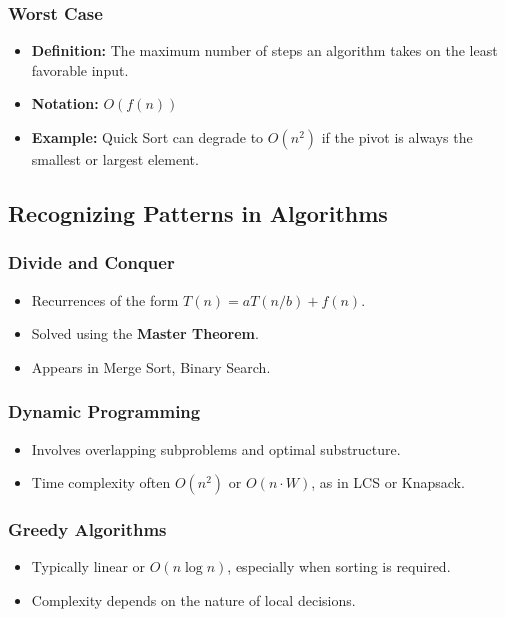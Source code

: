 \documentclass[12pt]{article}
\begin{document}
\subsubsection{Worst Case}
\begin{itemize}
    \item \textbf{Definition:} The maximum number of steps an algorithm takes on the least favorable input.
    \item \textbf{Notation:} \( O(f(n)) \)
    \item \textbf{Example:} Quick Sort can degrade to \( O(n^2) \) if the pivot is always the smallest or largest element.
\end{itemize}

\subsection{Recognizing Patterns in Algorithms}

\subsubsection{Divide and Conquer}
\begin{itemize}
    \item Recurrences of the form \( T(n) = aT(n/b) + f(n) \).
    \item Solved using the \textbf{Master Theorem}.
    \item Appears in Merge Sort, Binary Search.
\end{itemize}

\subsubsection{Dynamic Programming}
\begin{itemize}
    \item Involves overlapping subproblems and optimal substructure.
    \item Time complexity often \( O(n^2) \) or \( O(n \cdot W) \), as in LCS or Knapsack.
\end{itemize}

\subsubsection{Greedy Algorithms}
\begin{itemize}
    \item Typically linear or \( O(n \log n) \), especially when sorting is required.
    \item Complexity depends on the nature of local decisions.
\end{itemize}
\end{document}
